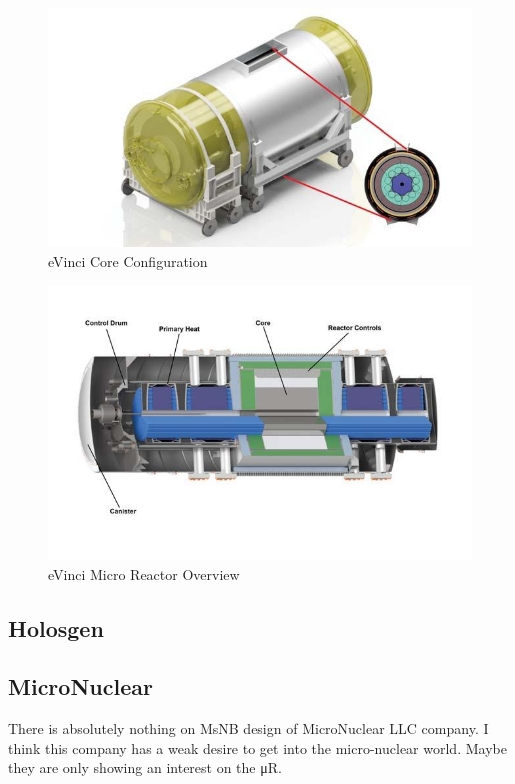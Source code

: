 \documentclass[10pt,a4paper]{article}
\begin{document}
\begin{figure}[hbtp]
\centering
\includegraphics[scale=0.5]{Figs/fig1.jpeg}
\caption{eVinci Core Configuration}
\end{figure}

\begin{figure}[hbtp]
\centering
\includegraphics[scale=0.5]{Figs/fig2.jpeg}
\caption{eVinci Micro Reactor Overview}
\end{figure}


\subsection{Holosgen}

\subsection{MicroNuclear}
There is absolutely nothing on MsNB design of MicroNuclear LLC company. I think this company has a weak desire to get into the micro-nuclear world. Maybe they are only showing an interest on the μR. 
\end{document}
